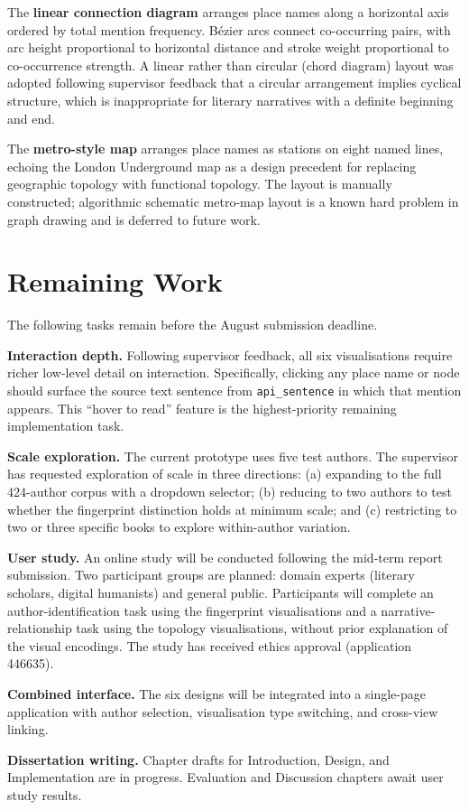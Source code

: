 \documentclass[11pt,a4paper]{article}
\begin{document}
The \textbf{linear connection diagram} arranges place names along a horizontal axis ordered by total mention frequency. Bézier arcs connect co-occurring pairs, with arc height proportional to horizontal distance and stroke weight proportional to co-occurrence strength. A linear rather than circular (chord diagram) layout was adopted following supervisor feedback that a circular arrangement implies cyclical structure, which is inappropriate for literary narratives with a definite beginning and end.

The \textbf{metro-style map} arranges place names as stations on eight named lines, echoing the London Underground map as a design precedent for replacing geographic topology with functional topology. The layout is manually constructed; algorithmic schematic metro-map layout is a known hard problem in graph drawing \cite{nollenburg2006} and is deferred to future work.

\section{Remaining Work}

The following tasks remain before the August submission deadline.

\textbf{Interaction depth.} Following supervisor feedback, all six visualisations require richer low-level detail on interaction. Specifically, clicking any place name or node should surface the source text sentence from \texttt{api\_sentence} in which that mention appears. This ``hover to read'' feature is the highest-priority remaining implementation task.

\textbf{Scale exploration.} The current prototype uses five test authors. The supervisor has requested exploration of scale in three directions: (a) expanding to the full 424-author corpus with a dropdown selector; (b) reducing to two authors to test whether the fingerprint distinction holds at minimum scale; and (c) restricting to two or three specific books to explore within-author variation.

\textbf{User study.} An online study will be conducted following the mid-term report submission. Two participant groups are planned: domain experts (literary scholars, digital humanists) and general public. Participants will complete an author-identification task using the fingerprint visualisations and a narrative-relationship task using the topology visualisations, without prior explanation of the visual encodings. The study has received ethics approval (application 446635).

\textbf{Combined interface.} The six designs will be integrated into a single-page application with author selection, visualisation type switching, and cross-view linking.

\textbf{Dissertation writing.} Chapter drafts for Introduction, Design, and Implementation are in progress. Evaluation and Discussion chapters await user study results.



\end{document}
